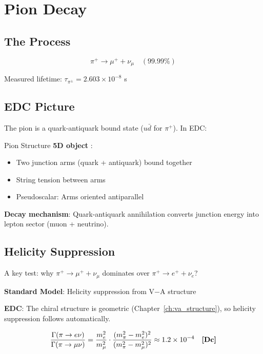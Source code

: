 \section{Pion Decay}
\label{sec:pion_decay}

\subsection{The Process}

\begin{equation}
\pi^+ \to \mu^+ + \nu_\mu \quad (99.99\%)
\end{equation}

Measured lifetime: $\tau_{\pi^\pm} = 2.603 \times 10^{-8}$ s \tagBL

\subsection{EDC Picture}

The pion is a quark-antiquark bound state ($u\bar{d}$ for $\pi^+$).
In EDC:

\begin{mechanism}{Pion Structure}
\textbf{5D object} \tagP{}:
\begin{itemize}[nosep]
\item Two junction arms (quark + antiquark) bound together
\item String tension between arms
\item Pseudoscalar: Arms oriented antiparallel
\end{itemize}

\textbf{Decay mechanism}:
Quark-antiquark annihilation converts junction energy into
lepton sector (muon + neutrino).
\end{mechanism}

\subsection{Helicity Suppression}

A key test: why $\pi^+ \to \mu^+ + \nu_\mu$ dominates over
$\pi^+ \to e^+ + \nu_e$?

\textbf{Standard Model}: Helicity suppression from V$-$A structure

\textbf{EDC}: The chiral structure is geometric (Chapter~\ref{ch:va_structure}),
so helicity suppression follows automatically.

\begin{equation}
\frac{\Gamma(\pi \to e\nu)}{\Gamma(\pi \to \mu\nu)} =
\frac{m_e^2}{m_\mu^2} \cdot \frac{(m_\pi^2 - m_e^2)^2}{(m_\pi^2 - m_\mu^2)^2}
\approx 1.2 \times 10^{-4} \quad \textbf{[Dc]}
\end{equation}

